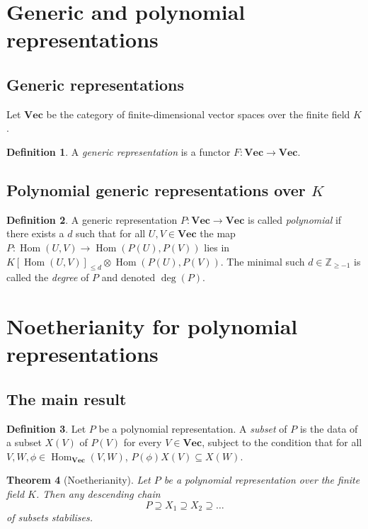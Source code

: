 \documentclass[10pt,a4paper]{amsart}
\theoremstyle{plain}
\newtheorem{thm}{Theorem}
\theoremstyle{definition}
\newtheorem{de}[thm]{Definition}
\renewcommand{\Vec}{\mathbf{Vec}}
\newcommand{\ZZ}{{\mathbb Z}}
\newcommand{\Hom}{\operatorname{Hom}\nolimits}
\begin{document}
\section{Generic and polynomial representations}
\subsection{Generic representations}

Let $\Vec$ be the category of finite-dimensional vector spaces over the
finite field $K$.

\begin{de}
A {\em generic representation} is a functor $F:\Vec \to \Vec$.  
\end{de}

\subsection{Polynomial generic representations over $K$}

\begin{de} \label{de:PolRep}
A generic representation $P:\Vec \to \Vec$ is called {\em polynomial}
if there exists a $d$ such that for all $U,V \in \Vec$ the map
$P:\Hom(U,V) \to \Hom(P(U),P(V))$ lies in $K[\Hom(U,V)]_{\leq d} \otimes
\Hom(P(U),P(V))$. The minimal such $d \in \ZZ_{\geq -1}$ is called the
{\em degree} of $P$ and denoted $\deg(P)$.
\end{de}

\section{Noetherianity for polynomial representations}
\label{sec:Noetherianity}

\subsection{The main result}

\begin{de} \label{de:Subset}
Let $P$ be a polynomial representation. A {\em subset} of $P$ is the data of a
subset $X(V)$ of $P(V)$ for every $V \in \Vec$, subject to the condition
that for all $V,W,\phi \in \Hom_\Vec(V,W)$, $P(\phi)X(V) \subseteq X(W)$.
\end{de}

\begin{thm}[Noetherianity] \label{thm:Noetherianity}
Let $P$ be a polynomial representation over the finite field $K$. Then
any descending chain
\[ P \supseteq X_1 \supseteq X_2 \supseteq \ldots \]
of subsets stabilises.
\end{thm}
\end{document}
